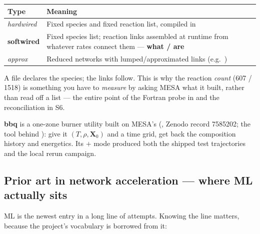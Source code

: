 \begin{center}
\small
\begin{tabularx}{\textwidth}{@{}l Y@{}}
\toprule
\textbf{Type} & \textbf{Meaning} \\
\midrule
\emph{hardwired} & Fixed species and fixed reaction list, compiled in \\
\textbf{softwired} &
  Fixed species list; reaction links assembled at runtime from whatever rates
  connect them --- \textbf{what / are} \\
\emph{approx} &
  Reduced networks with lumped/approximated links (e.g.\ ) \\
\bottomrule
\end{tabularx}
\end{center}

A  file declares the species; the links follow. This is why the
reaction \emph{count} (607 / 1518) is something you have to \emph{measure} by
asking MESA what it built, rather than read off a list --- the entire point of
the Fortran probe in  and the reconciliation in
S6.

\textbf{bbq} is a one-zone burner utility built on MESA's 
(\citealt{farmerbbq}, Zenodo record 7585202; the tool behind
\citealt{grichener2025}): give it $(T, \rho, \mathbf{X}_0)$ and a time grid, get
back the composition history and energetics. Its  $+$
 mode produced both the shipped test trajectories and
the local rerun campaign.

\subsection{Prior art in network acceleration --- where ML actually sits}
\label{sec:priorart}

ML is the newest entry in a long line of attempts. Knowing the line matters,
because the project's vocabulary is borrowed from it:

